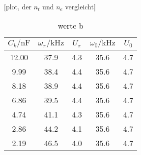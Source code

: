 [plot, der $n_t$ und $n_e$ vergleicht]




\begin{table}
    \centering
    \caption{werte b}
    \label{tab:b}
    \begin{tabular}{c c c c c}
    \toprule
    {$C_k / \si{\nano\farad}$} & {$\omega_{\pi} / \si{\kilo\hertz}$} & {$U_{\pi}$} & {$\omega_0 / \si{\kilo\hertz}$} & {$U_0$} \\
    \midrule
    12.00 & 37.9 & 4.3 & 35.6 & 4.7 \\
     9.99 & 38.4 & 4.4 & 35.6 & 4.7 \\
     8.18 & 38.9 & 4.4 & 35.6 & 4.7 \\
     6.86 & 39.5 & 4.4 & 35.6 & 4.7 \\
     4.74 & 41.1 & 4.3 & 35.6 & 4.7 \\
     2.86 & 44.2 & 4.1 & 35.6 & 4.7 \\
     2.19 & 46.5 & 4.0 & 35.6 & 4.7 \\
     \bottomrule
    \end{tabular}
\end{table}
